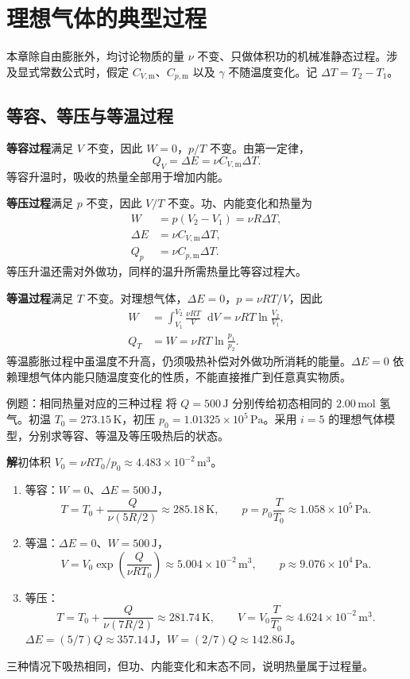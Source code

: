 \documentclass[UTF8,fontset=none,zihao=-4,a4paper]{ctexart}
\newcommand{\chapterpage}[1]{\clearpage\section{#1}}
\newcommand{\term}[1]{\textbf{#1}}
\newcommand{\dd}{\mathop{}\!\mathrm{d}}
\newcommand{\unit}[1]{\,\mathrm{#1}}
\newcommand{\sol}{\par\noindent\textbf{解}\quad}
\begin{document}
\chapterpage{理想气体的典型过程}
本章除自由膨胀外，均讨论物质的量 $\nu$ 不变、只做体积功的机械准静态过程。涉及显式常数公式时，假定 $C_{V,\mathrm m}$、$C_{p,\mathrm m}$ 以及 $\gamma$ 不随温度变化。记 $\Delta T=T_2-T_1$。

\subsection{等容、等压与等温过程}
\term{等容过程}满足 $V$ 不变，因此 $W=0$，$p/T$ 不变。由第一定律，
\[
 Q_V=\Delta E=\nu C_{V,\mathrm m}\Delta T.
\]
等容升温时，吸收的热量全部用于增加内能。

\term{等压过程}满足 $p$ 不变，因此 $V/T$ 不变。功、内能变化和热量为
\begin{align*}
 W&=p(V_2-V_1)=\nu R\Delta T,\\
 \Delta E&=\nu C_{V,\mathrm m}\Delta T,\\
 Q_p&=\nu C_{p,\mathrm m}\Delta T.
\end{align*}
等压升温还需对外做功，同样的温升所需热量比等容过程大。

\term{等温过程}满足 $T$ 不变。对理想气体，$\Delta E=0$，$p=\nu RT/V$，因此
\begin{align*}
 W&=\int_{V_1}^{V_2}\frac{\nu RT}{V}\dd V
 =\nu RT\ln\frac{V_2}{V_1},\\
 Q_T&=W=\nu RT\ln\frac{p_1}{p_2}.
\end{align*}
等温膨胀过程中虽温度不升高，仍须吸热补偿对外做功所消耗的能量。$\Delta E=0$ 依赖理想气体内能只随温度变化的性质，不能直接推广到任意真实物质。

\begin{infobox}{例题：相同热量对应的三种过程}
将 $Q=500\unit J$ 分别传给初态相同的 $2.00\unit{mol}$ 氢气。初温 $T_0=273.15\unit K$，初压 $p_0=1.01325\times10^5\unit{Pa}$。采用 $i=5$ 的理想气体模型，分别求等容、等温及等压吸热后的状态。
\end{infobox}
\sol 初体积 $V_0=\nu RT_0/p_0\approx4.483\times10^{-2}\unit{m^3}$。
\begin{enumerate}
\item 等容：$W=0$、$\Delta E=500\unit J$，
\[
 T=T_0+\frac{Q}{\nu(5R/2)}\approx285.18\unit K,
 \qquad p=p_0\frac{T}{T_0}\approx1.058\times10^5\unit{Pa}.
\]
\item 等温：$\Delta E=0$、$W=500\unit J$，
\[
 V=V_0\exp\left(\frac{Q}{\nu RT_0}\right)
 \approx5.004\times10^{-2}\unit{m^3},
 \qquad p\approx9.076\times10^4\unit{Pa}.
\]
\item 等压：
\[
 T=T_0+\frac{Q}{\nu(7R/2)}\approx281.74\unit K,
 \qquad V=V_0\frac{T}{T_0}\approx4.624\times10^{-2}\unit{m^3}.
\]
$\Delta E=(5/7)Q\approx357.14\unit J$，$W=(2/7)Q\approx142.86\unit J$。
\end{enumerate}
三种情况下吸热相同，但功、内能变化和末态不同，说明热量属于过程量。
\end{document}
